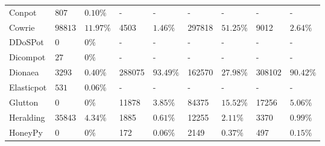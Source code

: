 \begin{table}
\begin{tabularx}{\linewidth}{l|XX|XX|XX|XX}
        Conpot \cite{conpot2021}                  & $807$                                  & $0.10\%$                                 & -                                & -                                  & -               & -             & -               & -             \\
        Cowrie \cite{cowire2021}                  & $98813$                                & $11.97\%$                                & 4503                             & $1.46\%$                           & 297818          & $51.25\%$     & 9012            & $2.64\%$      \\
        DDoSPot \cite{ddosspot2021}               & $0$                                    & $0\%$                                    & -                                & -                                  & -               & -             & -               & -             \\
        Dicompot \cite{dicompot2021}              & $27$                                   & $0\%$                                    & -                                & -                                  & -               & -             & -               & -             \\
        Dionaea \cite{dionaea2021}                & $3293$                                 & $0.40\%$                                 & 288075                           & $93.49\%$                          & 162570          & $27.98\%$     & 308102          & $90.42\%$     \\
        Elasticpot \cite{elasticpot2021}          & $531$                                  & $0.06\%$                                 & -                                & -                                  & -               & -             & -               & -             \\
        Glutton \cite{glutton2021}                & $0$                                    & $0\%$                                    & 11878                            & $3.85\%$                           & 84375           & $15.52\%$     & 17256           & $5.06\%$      \\
        Heralding \cite{heralding2021}            & $35843$                                & $4.34\%$                                 & 1885                             & $0.61\%$                           & 12255           & $2.11\%$      & 3370            & $0.99\%$      \\
        HoneyPy \cite{honeysap2021}               & $0$                                    & $0\%$                                    & 172                              & $0.06\%$                           & 2149            & $0.37\%$      & 497             & $0.15\%$      \\

\end{tabularx}
\end{table}
